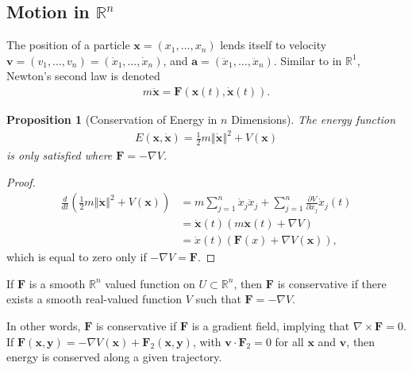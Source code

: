 \documentclass[10pt]{extarticle}
\newcommand{\R}{\mathbb{R}}
\newcommand{\norm}[1]{\left\Vert #1\right\Vert}
\theoremstyle{plain}
\newtheorem*{proposition}{Proposition}%
\theoremstyle{definition}
\theoremstyle{remark}
\renewcommand{\newline}{\hfill\break}
\begin{document}
  \subsection{Motion in $\R^n$}%
  The position of a particle $\mathbf{x} = (x_1,\dots,x_n)$ lends itself to velocity $\mathbf{v} = (v_1,\dots,v_n) = (\dot{x}_1,\dots,\dot{x}_n)$, and $\mathbf{a} = (\ddot{x}_1,\dots,\ddot{x}_n)$. Similar to in $\R^1$, Newton's second law is denoted
  \begin{align*}
    m\mathbf{\ddot{x}} = \mathbf{F}(\mathbf{x}(t),\mathbf{\dot{x}}(t)).
  \end{align*}
  \begin{proposition}[Conservation of Energy in $n$ Dimensions]
    The energy function
    \begin{align*}
      E(\mathbf{x},\mathbf{\dot{x}}) = \frac{1}{2}m\norm{\mathbf{\dot{x}}}^2 + V(\mathbf{x})
    \end{align*}
    is only satisfied where $\mathbf{F} = -\nabla V$.
  \end{proposition}
  \begin{proof}
      \begin{align*}
        \frac{d}{dt}\left(\frac{1}{2}m\norm{\mathbf{\dot{x}}}^2 + V(\mathbf{x})\right) &= m\sum_{j=1}^{n}\dot{x}_j\ddot{x}_j + \sum_{j=1}^{n}\frac{\partial V}{\partial x_j}\dot{x}_j(t)\\
                                                                                 &= \mathbf{\dot{x}}(t)\left(m\mathbf{\ddot{x}}(t) + \nabla V\right)\\
                                                                                 &= \dot{x}(t)\left(\mathbf{F}(x) + \nabla V(\mathbf{x})\right),
      \end{align*}
      which is equal to zero only if $-\nabla V = \mathbf{F}$.
  \end{proof}
  If $\mathbf{F}$ is a smooth $\R^n$ valued function on $U\subset \R^n$, then $\mathbf{F}$ is conservative if there exists a smooth real-valued function $V$ such that $\mathbf{F} = -\nabla V$.\newline

  In other words, $\mathbf{F}$ is conservative if $\mathbf{F}$ is a gradient field, implying that $\nabla \times \mathbf{F} = 0$.\\

  If $\mathbf{F}(\mathbf{x},\mathbf{y}) = -\nabla V(\mathbf{x}) + \mathbf{F}_{2}(\mathbf{x},\mathbf{y})$, with $\mathbf{v}\cdot \mathbf{F}_{2} = 0$ for all $\mathbf{x}$ and $\mathbf{v}$, then energy is conserved along a given trajectory.
\end{document}
